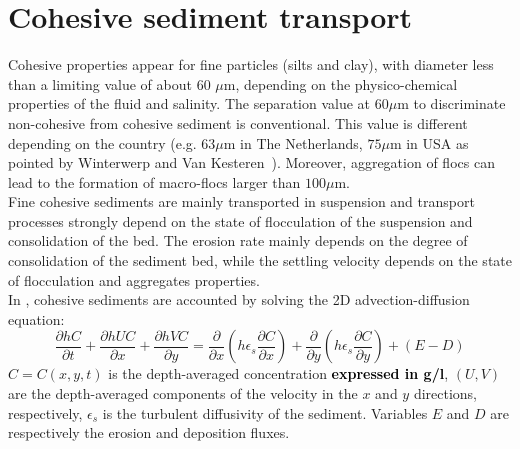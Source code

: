\section{Cohesive sediment transport}
Cohesive properties appear for fine particles (silts and clay), with diameter less than a limiting value of about 60 $\mu$m, depending on the physico-chemical
properties of the fluid and salinity. The separation value at $60\mu$m to discriminate non-cohesive from cohesive sediment is conventional. This value is different depending on the country (e.g. $63\mu$m in The Netherlands, $75\mu$m in USA as pointed by Winterwerp and Van Kesteren~\cite{Winterwerp}). Moreover, aggregation of flocs can lead to the formation of macro-flocs larger than $100\mu$m.\\

Fine cohesive sediments are mainly transported in suspension and transport processes strongly depend on the state of flocculation of the suspension and consolidation of the bed. The erosion rate mainly depends on the degree of consolidation of the sediment bed, while the settling velocity depends on the state of flocculation and aggregates properties.\\

In \gaia{}, cohesive sediments are accounted by solving the 2D advection-diffusion equation:
\begin{equation*}
\frac{\partial hC}{\partial t} + \frac{\partial hUC}{\partial x} + \frac{\partial hVC}{\partial y} =
\frac{\partial}{\partial x}\left(h\epsilon_s\frac{\partial C}{\partial x}\right) +
\frac{\partial}{\partial y}\left(h\epsilon_s\frac{\partial C}{\partial y}\right) + (E-D)
\end{equation*}
$C=C(x,y,t)$ is the depth-averaged concentration \textcolor{black}{\bf expressed in g/l}, $(U,V)$ are the depth-averaged components of the velocity in the $x$ and $y$ directions, respectively, $\epsilon_s$ is the turbulent diffusivity of the sediment. Variables $E$ and $D$ are respectively the erosion and deposition fluxes.
